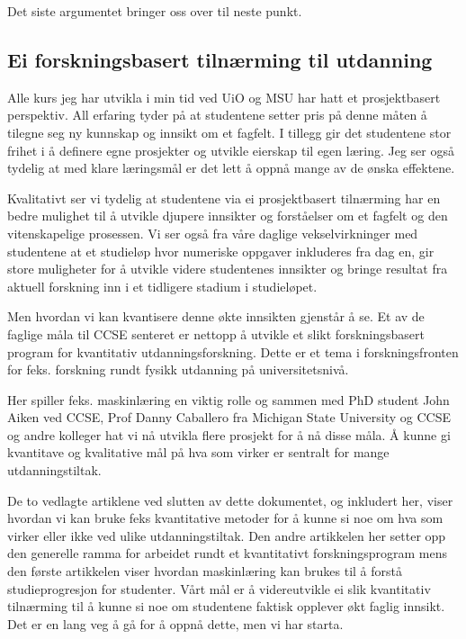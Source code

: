 \documentclass[aps,floatfix,preprint]{revtex4-1}
\begin{document}
Det siste argumentet bringer oss  over til neste punkt.


\subsection*{Ei forskningsbasert tilnærming til utdanning}


Alle kurs jeg har utvikla i min tid ved UiO og MSU har hatt et
prosjektbasert perspektiv. All erfaring tyder på at studentene setter
pris på denne måten å tilegne seg ny kunnskap og innsikt om et
fagfelt. I tillegg gir det studentene stor frihet i å definere egne
prosjekter og utvikle eierskap til egen læring. Jeg ser også tydelig
at med klare læringsmål er det lett å oppnå mange av de ønska
effektene.

Kvalitativt ser vi tydelig at studentene via ei prosjektbasert tilnærming  har en bedre mulighet til å utvikle
djupere innsikter og forståelser om et fagfelt og den vitenskapelige
prosessen.  Vi ser også fra våre daglige vekselvirkninger med studentene at et studieløp hvor numeriske oppgaver inkluderes fra dag en, gir store muligheter for å utvikle videre studentenes innsikter og bringe resultat fra aktuell forskning inn i et tidligere stadium i studieløpet.

Men hvordan vi kan kvantisere denne økte innsikten gjenstår å se. Et
av de faglige måla til CCSE senteret er nettopp å utvikle et slikt
forskningsbasert program for kvantitativ utdanningsforskning. Dette er
et tema i forskningsfronten for feks. forskning rundt fysikk utdanning
på universitetsnivå.


Her spiller feks. maskinlæring en viktig rolle og sammen med PhD
student John Aiken ved CCSE, Prof Danny Caballero fra Michigan State University og CCSE
og andre kolleger hat vi nå utvikla flere prosjekt for å nå disse
måla.  Å kunne gi kvantitave og kvalitative mål på hva som virker er
sentralt for mange utdanningstiltak.

De to vedlagte artiklene ved slutten av dette dokumentet, og inkludert
her, viser hvordan vi kan bruke feks kvantitative metoder for å kunne
si noe om hva som virker eller ikke ved ulike utdanningstiltak. Den
andre artikkelen her setter opp den generelle ramma for arbeidet
rundt et kvantitativt forskningsprogram mens den første artikkelen
viser hvordan maskinlæring kan brukes til å forstå studieprogresjon
for studenter. Vårt mål er å videreutvikle ei slik kvantitativ
tilnærming til å kunne si noe om studentene faktisk opplever økt
faglig innsikt. Det er en lang veg å gå for å oppnå dette, men vi har
starta.
\end{document}
